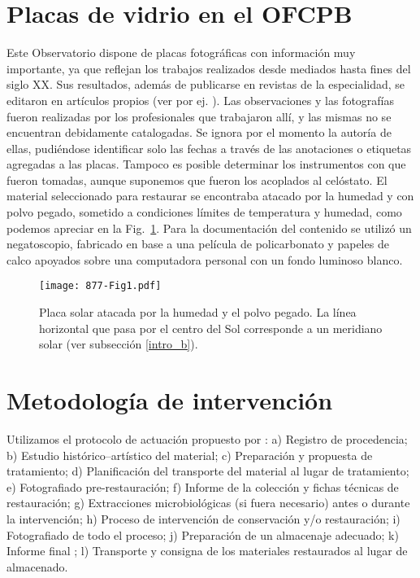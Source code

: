 \documentclass[baaa]{baaa}
\begin{document}
\section{Placas de vidrio en el OFCPB}\label{placas}
Este Observatorio dispone de placas fotográficas con información muy importante, ya que reflejan los trabajos realizados desde mediados hasta
fines del siglo XX. Sus resultados, además de publicarse en revistas de la especialidad, se editaron en artículos propios (ver por ej. \citealp{OFCSM1938publi}).
Las observaciones y las fotografías fueron realizadas por los profesionales que trabajaron allí, y las mismas no se encuentran debidamente catalogadas.
Se ignora por el momento la autoría de ellas, pudiéndose identificar solo las fechas a través de las anotaciones o etiquetas agregadas a las placas.
Tampoco es posible determinar los instrumentos con que fueron tomadas, aunque suponemos que fueron los acoplados al celóstato. 
El material seleccionado para restaurar se encontraba atacado por la humedad y con polvo pegado, sometido a condiciones límites de temperatura y humedad, como podemos apreciar en la  Fig.~\ref{Fig1}.
Para la documentación del contenido se utilizó un negatoscopio, fabricado en base a una película de policarbonato y papeles de calco apoyados sobre una computadora personal con un fondo luminoso blanco. 

\begin{figure}[!t]
\centering
\texttt{[image: 877-Fig1.pdf]}
\caption{Placa solar atacada por la humedad y el polvo pegado. La línea horizontal que pasa por el centro del Sol corresponde a un meridiano solar (ver subsección \ref{intro_b}).}
\label{Fig1}
\end{figure}

\section{Metodología de intervención}

Utilizamos el protocolo de actuación propuesto por \citet{hg_2014}: a) Registro de procedencia; b) Estudio histórico–artístico del material; c) Preparación y propuesta de tratamiento; d) Planificación del transporte del material al lugar de tratamiento; e)  Fotografiado pre-restauración; f) Informe de la colección y fichas técnicas de restauración; g) Extracciones microbiológicas (si fuera necesario) antes o durante la intervención; h) Proceso de intervención de conservación y/o restauración; i) Fotografiado de todo el proceso; j) Preparación de un almacenaje adecuado; k) Informe final ; l) Transporte y consigna de los materiales restaurados al lugar de almacenado.
\end{document}
